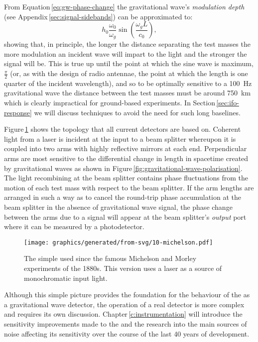 From Equation\,\ref{eq:gw-phase-change} the gravitational wave's \emph{modulation depth} (see Appendix\,\ref{sec:signal-sidebands}) can be approximated to:
\begin{equation}
  \label{eq:gw-mod-depth}
  h_0 \frac{\omega_0}{\omega_g} \sin \left( \frac{\omega_g L}{c_0} \right),
\end{equation}
showing that, in principle, the longer the distance separating the test masses the more modulation an incident wave will impart to the light and the stronger the signal will be. This is true up until the point at which the sine wave is maximum, $\frac{\pi}{2}$ (or, as with the design of radio antennae, the point at which the length is one quarter of the incident wavelength), and so to be optimally sensitive to a \SI{100}{\hertz} gravitational wave the distance between the test masses must be around \SI{750}{\kilo\meter} which is clearly impractical for ground-based experiments. In Section\,\ref{sec:ifo-response} we will discuss techniques to avoid the need for such long baselines.

Figure\,\ref{fig:mi} shows the \MI{} topology that all current detectors are based on. Coherent light from a laser is incident at the input to a beam splitter whereupon it is coupled into two arms with highly reflective mirrors at each end. Perpendicular arms are most sensitive to the differential change in length in spacetime created by gravitational waves as shown in Figure\,\ref{fig:gravitational-wave-polarisation}. The light recombining at the beam splitter contains phase fluctuations from the motion of each test mass with respect to the beam splitter. If the arm lengths are arranged in such a way as to cancel the round-trip phase accumulation at the beam splitter in the absence of gravitational wave signal, the phase change between the arms due to a signal will appear at the beam splitter's \emph{output} port where it can be measured by a photodetector.

\begin{figure}
  \centering
  \texttt{[image: graphics/generated/from-svg/10-michelson.pdf]}
  \caption[Simple \MI{}]{\label{fig:mi}The simple \MI{} used since the famous Michelson and Morley experiments of the 1880s. This version uses a laser as a source of monochromatic input light.}
\end{figure}

Although this simple picture provides the foundation for the behaviour of the \MI{} as a gravitational wave detector, the operation of a real detector is more complex and requires its own discussion. Chapter\,\ref{c:instrumentation} will introduce the sensitivity improvements made to the \MI{} and the research into the main sources of noise affecting its sensitivity over the course of the last \num{40} years of development.

